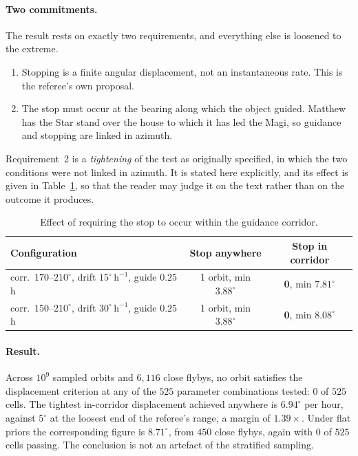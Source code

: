\documentclass[11pt,a4paper]{article}
\begin{document}
\paragraph{Two commitments.}
The result rests on exactly two requirements, and everything else is loosened
to the extreme.

\begin{enumerate}
  \item Stopping is a finite angular displacement, not an instantaneous rate.
    This is the referee's own proposal.
  \item The stop must occur at the bearing along which the object guided.
    Matthew has the Star stand over the house to which it has led the Magi, so
    guidance and stopping are linked in azimuth.
\end{enumerate}

Requirement~2 is a \emph{tightening} of the test as originally specified, in
which the two conditions were not linked in azimuth. It is stated here
explicitly, and its effect is given in Table~\ref{tab:corridorlink}, so that
the reader may judge it on the text rather than on the outcome it produces.

\begin{table}[h]
\centering
\begin{threeparttable}
  \caption{Effect of requiring the stop to occur within the guidance
    corridor.}\label{tab:corridorlink}
\begin{tabular}{@{}lcc@{}}
\toprule
Configuration & Stop anywhere & Stop in corridor \\
\midrule
corr.\ $170$--$210^\circ$, drift $15^\circ\,\mathrm{h}^{-1}$, guide $0.25$\,h
  & 1 orbit, min $3.88^\circ$ & \textbf{0}, min $7.81^\circ$ \\
corr.\ $150$--$210^\circ$, drift $30^\circ\,\mathrm{h}^{-1}$, guide $0.25$\,h
  & 1 orbit, min $3.88^\circ$ & \textbf{0}, min $8.08^\circ$ \\
\bottomrule
\end{tabular}
\end{threeparttable}
\end{table}

\paragraph{Result.}
Across $10^{9}$ sampled orbits and $6{,}116$ close flybys, no orbit satisfies
the displacement criterion at any of the $525$ parameter combinations tested:
$0$ of $525$ cells. The tightest in-corridor displacement achieved anywhere is
$\mathbf{6.94^\circ}$ per hour, against $5^\circ$ at the loosest end of the
referee's range, a margin of $1.39\times$. Under flat priors the corresponding
figure is $8.71^\circ$, from $450$ close flybys, again with $0$ of $525$ cells
passing. The conclusion is not an artefact of the stratified sampling.
\end{document}
